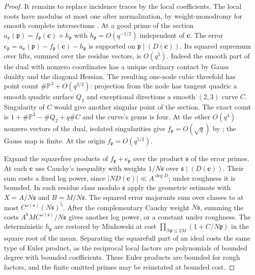 \documentclass[11pt,letterpaper]{article}
\theoremstyle{definition}
\numberwithin{equation}{section}
\begin{document}
\begin{proof}
It remains to replace incidence traces by the local coefficients.
The local roots have modulus at most one after normalization, by
weight-monodromy for smooth complete intersections
\cite[Theorem 9.6]{nf3:scholze}. At a good prime of the section
$a_{\mathbf c}(\mathfrak p)=f_{\mathfrak p}(\mathbf c)+h_{\mathfrak p}$
with $h_{\mathfrak p}=O(q^{-1/2})$ independent of $\mathbf c$.
The error $e_{\mathfrak p}=a_{\mathbf c}(\mathfrak p)
-f_{\mathfrak p}(\mathbf c)-h_{\mathfrak p}$ is supported on
$\mathfrak p\mid(D(\mathbf c))$. Its squared supremum over lifts,
summed over the residue vectors, is $O(q^5)$. Indeed the smooth
part of the dual with nonzero coordinates has a unique ordinary
contact by Gauss duality and the diagonal Hessian. The resulting
one-node cubic threefold has point count $\#\mathbb P^3+O(q^{3/2})$:
projection from the node has tangent quadric a smooth quadric surface
$Q_2$ and exceptional directions a smooth $(2,3)$ curve $C$.
Singularity of $C$ would give another singular point of the section.
The exact count is $1+\#\mathbb P^3-\#Q_2+q\#C$ and the curve's
genus is four. At the other $O(q^4)$ nonzero vectors of the dual,
isolated singularities give $f_{\mathfrak p}=O(\sqrt q)$ by
\cite{nf3:hooleycontact}; the Gauss map is finite. At the origin
$f_{\mathfrak p}=O(q^{5/2})$.

Expand the squarefree products of $f_{\mathfrak p}+e_{\mathfrak p}$
over the product $\mathfrak s$ of the error primes. At each
$\mathbf c$ use Cauchy's inequality with weights $1/N\mathfrak s$
over $\mathfrak s\mid(D(\mathbf c))$. Their sum costs a fixed log
power, since $|N D(\mathbf c)|\ll A^{\deg D}$; under roughness it
is bounded. In each residue class modulo $\mathfrak s$ apply the
geometric estimate with $X=A/N\mathfrak s$ and
$B=M/N\mathfrak s$. The squared error majorants sum over classes
to at most $C^{\omega(\mathfrak s)}(N\mathfrak s)^5$. After the
complementary Cauchy weight $N\mathfrak s$, summing the costs
$A^6 M C^{\omega(\mathfrak s)}/N\mathfrak s$ gives another
log power, or a constant under roughness. The deterministic
$h_{\mathfrak p}$ are restored by Minkowski at cost
$\prod_{N\mathfrak p\le2M}(1+C/N\mathfrak p)$ in the square root
of the mean. Separating the squarefull part of an ideal costs the
same type of Euler product, as the reciprocal local factors are
polynomials of bounded degree with bounded coefficients. These
Euler products are bounded for rough factors, and the finite omitted
primes may be reinstated at bounded cost.


\end{proof}
\end{document}
